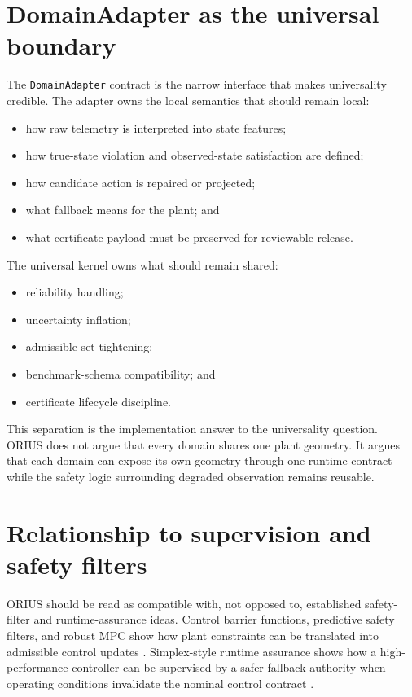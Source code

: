 \section{DomainAdapter as the universal boundary}
The \texttt{DomainAdapter} contract is the narrow interface that makes universality
credible. The adapter owns the local semantics that should remain local:
\begin{itemize}
  \item how raw telemetry is interpreted into state features;
  \item how true-state violation and observed-state satisfaction are defined;
  \item how candidate action is repaired or projected;
  \item what fallback means for the plant; and
  \item what certificate payload must be preserved for reviewable release.
\end{itemize}
The universal kernel owns what should remain shared:
\begin{itemize}
  \item reliability handling;
  \item uncertainty inflation;
  \item admissible-set tightening;
  \item benchmark-schema compatibility; and
  \item certificate lifecycle discipline.
\end{itemize}


This separation is the implementation answer to the universality question. ORIUS does not
argue that every domain shares one plant geometry. It argues that each domain can expose its
own geometry through one runtime contract while the safety logic surrounding degraded
observation remains reusable.

\section{Relationship to supervision and safety filters}
ORIUS should be read as compatible with, not opposed to, established safety-filter and
runtime-assurance ideas. Control barrier functions, predictive safety filters, and robust
MPC show how plant constraints can be translated into admissible control updates
\cite{ames2019control,ames2014cbf,wabersich2021predictive,mayne2005robust}. Simplex-style
runtime assurance shows how a high-performance controller can be supervised by a safer
fallback authority when operating conditions invalidate the nominal control contract
\cite{sha1998simplex,sha2001using}.

